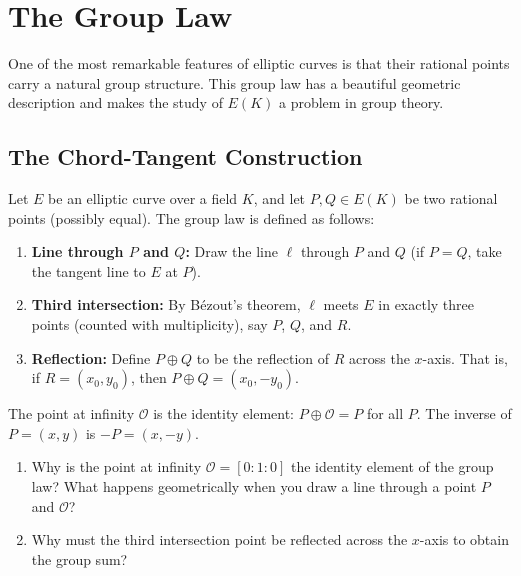 \section{The Group Law}
\label{sec:group-law}

One of the most remarkable features of elliptic curves is that their rational points carry a natural group structure. This group law has a beautiful geometric description and makes the study of $E(K)$ a problem in group theory.

\subsection{The Chord-Tangent Construction}

Let $E$ be an elliptic curve over a field $K$, and let $P, Q \in E(K)$ be two rational points (possibly equal). The group law is defined as follows:

\begin{enumerate}
\item \textbf{Line through $P$ and $Q$:} Draw the line $\ell$ through $P$ and $Q$ (if $P = Q$, take the tangent line to $E$ at $P$).
\item \textbf{Third intersection:} By Bézout's theorem, $\ell$ meets $E$ in exactly three points (counted with multiplicity), say $P$, $Q$, and $R$.
\item \textbf{Reflection:} Define $P \oplus Q$ to be the reflection of $R$ across the $x$-axis. That is, if $R = (x_0, y_0)$, then $P \oplus Q = (x_0, -y_0)$.
\end{enumerate}

The point at infinity $\mathcal{O}$ is the identity element: $P \oplus \mathcal{O} = P$ for all $P$. The inverse of $P = (x, y)$ is $-P = (x, -y)$.

\begin{checkyou}
\begin{enumerate}
\item Why is the point at infinity $\mathcal{O} = [0:1:0]$ the identity element of the group law? What happens geometrically when you draw a line through a point $P$ and $\mathcal{O}$?
\item Why must the third intersection point be reflected across the $x$-axis to obtain the group sum?
\end{enumerate}
\end{checkyou}

